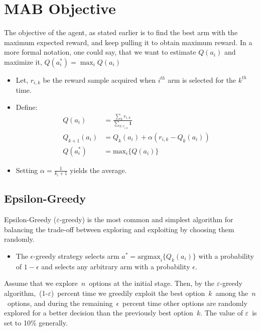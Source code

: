 \section{MAB Objective}
The objective of the agent, as stated earlier is to find the best arm with the maximum expected reward, and keep pulling it to obtain maximum reward.
In a more formal notation, one could say, that we want to estimate $Q(a_i)$ and maximize it, $Q(a^*_i) = \max_i{Q(a_i)}$

\begin{itemize}
    \item Let, $r_{i,k}$ be the reward sample acquired when $i^{th}$ arm is selected for the $k^{th}$ time.
    \item Define:
    \begin{equation*}
        \begin{split}
            Q(a_i) &= \frac{\sum_k r_{i,k}}{\sum_{k:r_{i,k}}\mathbf{1}}\\
            Q_{k+1}(a_i) &= Q_k(a_i) + \alpha ( r_{i,k} - Q_k(a_i))\\
            Q(a^*_i) &= \text{max}_i \{Q(a_i)\}
        \end{split}
    \end{equation*}
    \item Setting $\alpha = \frac{1}{k_i + 1}$ yields the average.
\end{itemize}

\subsection{Epsilon-Greedy}
Epsilon-Greedy ($\varepsilon$-greedy) is the most common and simplest algorithm for balancing the trade-off between exploring and exploiting by choosing them randomly.
\begin{itemize}
    \item The $\epsilon$-greedy strategy selects arm $a^* = \text{argmax}_i \{Q_k(a_i)\}$ with a probability of $1-\epsilon$ and selects any arbitrary arm with a probability $\epsilon$.
\end{itemize}
Assume that we explore $n$ options at the initial stage.
Then, by the $\varepsilon$-greedy algorithm, (1-$\varepsilon$) percent time we greedily exploit the best option $k$ among the $n$ options, and during the remaining $\epsilon$ percent time other options are randomly explored for a better decision than the previously best option $k$.
The value of $\varepsilon$ is set to 10\% generally.

